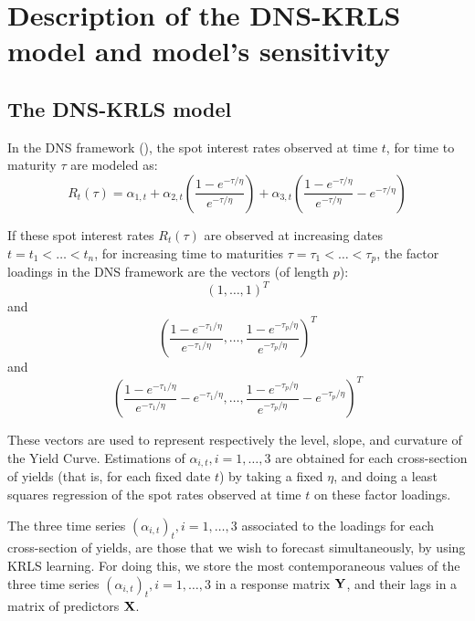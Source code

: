 \section{Description of the DNS-KRLS model and model's sensitivity}
\label{sec:dnskrls}

\subsection{The DNS-KRLS model}

In the DNS framework (\cite{diebold2006forecasting}), the spot interest rates observed at time $t$, for time to maturity $\tau$ are modeled as:
\begin{equation}
R_t(\tau) = \alpha_{1, t} + \alpha_{2, t}\left(\frac{1-e^{-\tau/\eta}}{e^{-\tau/\eta}}\right) + \alpha_{3, t}\left(\frac{1-e^{-\tau/\eta}}{e^{-\tau/\eta}} - e^{-\tau/\eta}\right)
\end{equation}

\medskip

If these spot interest rates $R_t(\tau)$ are observed at increasing dates $t = t_1 < \ldots < t_n$, for increasing time to maturities $\tau = \tau_1 < \ldots < \tau_p$, the factor loadings in the DNS framework are the vectors (of length $p$):  
$$
(1, \ldots, 1)^T
$$
and
$$
\left(\frac{1-e^{-\tau_1/\eta}}{e^{-\tau_1/\eta}}, \ldots, \frac{1-e^{-\tau_p/\eta}}{e^{-\tau_p/\eta}}\right)^T
$$ 
and 
$$
\left(\frac{1-e^{-\tau_1/\eta}}{e^{-\tau_1/\eta}} - e^{-\tau_1/\eta}, \ldots, \frac{1-e^{-\tau_p/\eta}}{e^{-\tau_p/\eta}} - e^{-\tau_p/\eta}\right)^T
$$ 

\medskip

These vectors are used to represent respectively the level, slope, and curvature of the Yield Curve. Estimations of $\alpha_{i, t}, i = 1, \ldots, 3$ are obtained for each cross-section of yields (that is, for each fixed date $t$) by taking a fixed $\eta$, and doing a least squares regression of the spot rates observed at time $t$ on these factor loadings. 

\medskip

The three time series $(\alpha_{i, t})_t, i = 1, \ldots, 3$ associated to the loadings for each cross-section of yields, are those that we wish to forecast simultaneously, by using KRLS learning. For doing this, we store the most contemporaneous values of the three time series $(\alpha_{i, t})_t, i = 1, \ldots, 3$ in a response matrix ${\bf Y}$, and their lags in a matrix of predictors ${\bf X}$. 

\medskip

